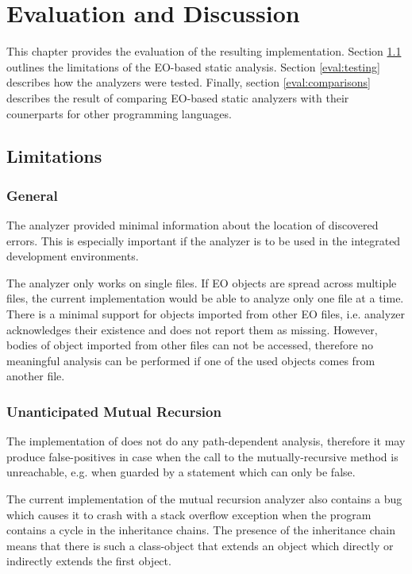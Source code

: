\chapter{Evaluation and Discussion}
\label{chap:eval}
This chapter provides the evaluation of the resulting implementation. Section \ref{eval:limitations} outlines the limitations of the EO-based static analysis. Section \ref{eval:testing} describes how the analyzers were tested. Finally, section \ref{eval:comparisons} describes the result of comparing EO-based static analyzers with their counerparts for other programming languages.

\section{Limitations}
\label{eval:limitations}

\subsection{General}
The analyzer provided minimal information about the location of discovered errors. This is especially important if the analyzer is to be used in the integrated development environments.

The analyzer only works on single files. If EO objects are spread across multiple files, the current implementation would be able to analyze only one file at a time. There is a minimal support for objects imported from other EO files, i.e. analyzer acknowledges their existence and does not report them as missing. However, bodies of object imported from other files can not be accessed, therefore no meaningful analysis can be performed if one of the used objects comes from another file.

\subsection{Unanticipated Mutual Recursion}
The implementation of does not do any path-dependent analysis, therefore it may produce false-positives in case when the call to the mutually-recursive method is unreachable, e.g. when guarded by a statement which can only be false.

The current implementation of the mutual recursion analyzer also contains a bug which causes it to crash with a stack overflow exception when the program contains a cycle in the inheritance chains. The presence of the inheritance chain means that there is such a class-object that extends an object which directly or indirectly extends the first object. 

